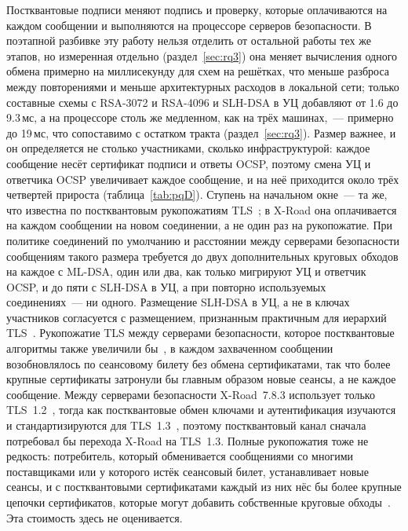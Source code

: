 \documentclass[conference,a4paper]{IEEEtran}
\newcommand{\newtext}[1]{{\color{blue}#1}}
\begin{document}
\newtext{Постквантовые подписи меняют подпись и проверку, которые оплачиваются на каждом сообщении
и выполняются на процессоре серверов безопасности. В поэтапной разбивке эту работу нельзя отделить от
остальной работы тех же этапов, но измеренная отдельно (раздел~\ref{sec:rq3}) она меняет
вычисления одного обмена примерно на миллисекунду для схем на решётках, что меньше разброса
между повторениями и меньше архитектурных расходов в локальной сети; только составные схемы
с RSA-3072 и RSA-4096 и SLH-DSA в УЦ добавляют от 1.6 до 9.3\,мс\newtext{, а на процессоре столь же медленном,
как на трёх машинах,~--- примерно до 19\,мс, что сопоставимо с остатком тракта
(раздел~\ref{sec:rq3})}. Размер важнее, и он
определяется не столько участниками, сколько инфраструктурой: каждое сообщение несёт сертификат
подписи и ответы OCSP, поэтому смена УЦ и ответчика OCSP увеличивает каждое
сообщение, и на неё приходится около трёх четвертей прироста (таблица~\ref{tab:pqD}). Ступень на
начальном окне~--- та же, что известна по постквантовым рукопожатиям
TLS~\cite{sikeridis2020,westerbaan2021,chou2026}; в X-Road она оплачивается на каждом сообщении на
новом соединении, а не один раз на рукопожатие. При политике соединений по умолчанию и расстоянии
между серверами безопасности сообщениям такого размера требуется до двух дополнительных круговых обходов на каждое с
ML-DSA, один или два, как только мигрируют УЦ и ответчик OCSP, и до пяти с SLH-DSA в УЦ, а при повторно используемых соединениях~--- ни одного. Размещение SLH-DSA в
УЦ, а не в ключах участников согласуется с размещением, признанным практичным для иерархий
TLS~\cite{delgado2026}.} Рукопожатие TLS между серверами
безопасности, которое постквантовые алгоритмы также увеличили бы~\cite{bakhtina2026pqc}, в каждом захваченном сообщении возобновлялось по
сеансовому билету без обмена сертификатами, так что более крупные сертификаты
затронули бы главным образом новые сеансы, а не каждое сообщение. \newtext{Между серверами безопасности
X-Road~7.8.3 использует только TLS~1.2~\cite{xroadsrc}, тогда как постквантовые обмен ключами и аутентификация
изучаются и стандартизируются для TLS~1.3~\cite{paquin2020,sikeridis2020}, поэтому постквантовый канал
сначала потребовал бы перехода X-Road на TLS~1.3. Полные рукопожатия тоже не редкость: потребитель, который
обменивается сообщениями со многими поставщиками или у которого истёк сеансовый билет, устанавливает новые сеансы,
и с постквантовыми сертификатами каждый из них нёс бы более крупные цепочки сертификатов, которые могут добавить
собственные круговые обходы~\cite{sikeridis2020}. Эта стоимость здесь не оценивается.}
\end{document}
